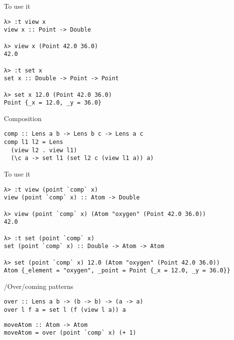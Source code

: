 \documentclass[presentation,aspectratio=169,8pt]{beamer}
\begin{document}
\begin{frame}[label={sec:orgedade99},fragile]{To use it}
 \begin{verbatim}
λ> :t view x
view x :: Point -> Double

λ> view x (Point 42.0 36.0)
42.0

λ> :t set x
set x :: Double -> Point -> Point

λ> set x 12.0 (Point 42.0 36.0)
Point {_x = 12.0, _y = 36.0}
\end{verbatim}
\end{frame}

\begin{frame}[label={sec:org00cd3e7},fragile]{Composition}
 \begin{verbatim}
comp :: Lens a b -> Lens b c -> Lens a c
comp l1 l2 = Lens
  (view l2 . view l1)
  (\c a -> set l1 (set l2 c (view l1 a)) a)
\end{verbatim}
\end{frame}

\begin{frame}[label={sec:org3ae49aa},fragile]{To use it}
 \begin{verbatim}
λ> :t view (point `comp` x)
view (point `comp` x) :: Atom -> Double

λ> view (point `comp` x) (Atom "oxygen" (Point 42.0 36.0))
42.0

λ> :t set (point `comp` x)
set (point `comp` x) :: Double -> Atom -> Atom

λ> set (point `comp` x) 12.0 (Atom "oxygen" (Point 42.0 36.0))
Atom {_element = "oxygen", _point = Point {_x = 12.0, _y = 36.0}}
\end{verbatim}
\end{frame}

\begin{frame}[label={sec:orgeedff50},fragile]{/Over/coming patterns}
 \begin{verbatim}
over :: Lens a b -> (b -> b) -> (a -> a)
over l f a = set l (f (view l a)) a
\end{verbatim}

\pause

\begin{verbatim}
moveAtom :: Atom -> Atom
moveAtom = over (point `comp` x) (+ 1)
\end{verbatim}
\end{frame}
\end{document}
